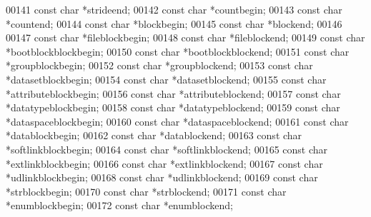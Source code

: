 \begin{DoxyCode}
{00141     \textcolor{keyword}{const} \textcolor{keywordtype}{char} *strideend;
00142     \textcolor{keyword}{const} \textcolor{keywordtype}{char} *countbegin;
00143     \textcolor{keyword}{const} \textcolor{keywordtype}{char} *countend;
00144     \textcolor{keyword}{const} \textcolor{keywordtype}{char} *blockbegin;
00145     \textcolor{keyword}{const} \textcolor{keywordtype}{char} *blockend;
00146 
00147     \textcolor{keyword}{const} \textcolor{keywordtype}{char} *fileblockbegin;
00148     \textcolor{keyword}{const} \textcolor{keywordtype}{char} *fileblockend;
00149     \textcolor{keyword}{const} \textcolor{keywordtype}{char} *bootblockblockbegin;
00150     \textcolor{keyword}{const} \textcolor{keywordtype}{char} *bootblockblockend;
00151     \textcolor{keyword}{const} \textcolor{keywordtype}{char} *groupblockbegin;
00152     \textcolor{keyword}{const} \textcolor{keywordtype}{char} *groupblockend;
00153     \textcolor{keyword}{const} \textcolor{keywordtype}{char} *datasetblockbegin;
00154     \textcolor{keyword}{const} \textcolor{keywordtype}{char} *datasetblockend;
00155     \textcolor{keyword}{const} \textcolor{keywordtype}{char} *attributeblockbegin;
00156     \textcolor{keyword}{const} \textcolor{keywordtype}{char} *attributeblockend;
00157     \textcolor{keyword}{const} \textcolor{keywordtype}{char} *datatypeblockbegin;
00158     \textcolor{keyword}{const} \textcolor{keywordtype}{char} *datatypeblockend;
00159     \textcolor{keyword}{const} \textcolor{keywordtype}{char} *dataspaceblockbegin;
00160     \textcolor{keyword}{const} \textcolor{keywordtype}{char} *dataspaceblockend;
00161     \textcolor{keyword}{const} \textcolor{keywordtype}{char} *datablockbegin;
00162     \textcolor{keyword}{const} \textcolor{keywordtype}{char} *datablockend;
00163     \textcolor{keyword}{const} \textcolor{keywordtype}{char} *softlinkblockbegin;
00164     \textcolor{keyword}{const} \textcolor{keywordtype}{char} *softlinkblockend;
00165     \textcolor{keyword}{const} \textcolor{keywordtype}{char} *extlinkblockbegin;
00166     \textcolor{keyword}{const} \textcolor{keywordtype}{char} *extlinkblockend;
00167     \textcolor{keyword}{const} \textcolor{keywordtype}{char} *udlinkblockbegin;
00168     \textcolor{keyword}{const} \textcolor{keywordtype}{char} *udlinkblockend;
00169     \textcolor{keyword}{const} \textcolor{keywordtype}{char} *strblockbegin;
00170     \textcolor{keyword}{const} \textcolor{keywordtype}{char} *strblockend;
00171     \textcolor{keyword}{const} \textcolor{keywordtype}{char} *enumblockbegin;
00172     \textcolor{keyword}{const} \textcolor{keywordtype}{char} *enumblockend;
}
\end{DoxyCode}
